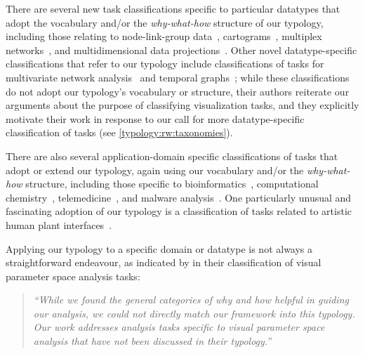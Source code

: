 There are several new task classifications specific to particular datatypes that adopt the vocabulary and/or the {\it why-what-how} structure of our typology, including those relating to node-link-group data~\cite{Saket2014,Saket2014a}, cartograms~\cite{Nusrat2015}, multiplex networks~\cite{Renoust2013}, and multidimensional data projections~\cite{Etemadpour2015}.
Other novel datatype-specific classifications that refer to our typology include classifications of tasks for multivariate network analysis~\cite{Pretorius2014} and temporal graphs~\cite{Kerracher2015}; while these classifications do not adopt our typology's vocabulary or structure, their authors reiterate our arguments about the purpose of classifying visualization tasks, and \citet{Kerracher2015} they explicitly motivate their work in response to our call for more datatype-specific classification of tasks (see \autoref{typology:rw:taxonomies}).

\begin{sloppypar}
There are also several application-domain specific classifications of tasks that adopt or extend our typology, again using our vocabulary and/or the {\it why-what-how} structure, including those specific to bioinformatics~\cite{Mirel2014}, computational chemistry~\cite{Vanderwoning2014}, telemedicine~\cite{Theisa2015}, and malware analysis~\cite{Wagner2015}.
One particularly unusual and fascinating adoption of our typology is a classification of tasks related to artistic human plant interfaces~\cite{Weil2014}.
\end{sloppypar}

Applying our typology to a specific domain or datatype is not always a straightforward endeavour, as indicated by \citet{Sedlmair2014} in their classification of visual parameter space analysis tasks:

\begin{quote}

    {\it ``While we found the general categories of why and how helpful in guiding our analysis, we could not directly match our framework into this typology. Our work addresses analysis tasks specific to visual parameter space analysis that have not been discussed in their typology.''}~\citep[p. 2167]{Sedlmair2014}
    
\end{quote}

